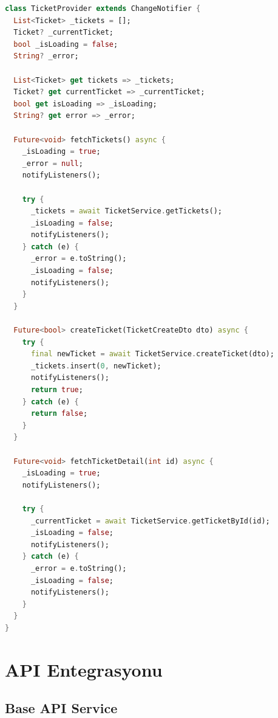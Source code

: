 \documentclass[12pt,a4paper]{article}
\begin{document}
\begin{lstlisting}[language=Dart]
class TicketProvider extends ChangeNotifier {
  List<Ticket> _tickets = [];
  Ticket? _currentTicket;
  bool _isLoading = false;
  String? _error;
  
  List<Ticket> get tickets => _tickets;
  Ticket? get currentTicket => _currentTicket;
  bool get isLoading => _isLoading;
  String? get error => _error;
  
  Future<void> fetchTickets() async {
    _isLoading = true;
    _error = null;
    notifyListeners();
    
    try {
      _tickets = await TicketService.getTickets();
      _isLoading = false;
      notifyListeners();
    } catch (e) {
      _error = e.toString();
      _isLoading = false;
      notifyListeners();
    }
  }
  
  Future<bool> createTicket(TicketCreateDto dto) async {
    try {
      final newTicket = await TicketService.createTicket(dto);
      _tickets.insert(0, newTicket);
      notifyListeners();
      return true;
    } catch (e) {
      return false;
    }
  }
  
  Future<void> fetchTicketDetail(int id) async {
    _isLoading = true;
    notifyListeners();
    
    try {
      _currentTicket = await TicketService.getTicketById(id);
      _isLoading = false;
      notifyListeners();
    } catch (e) {
      _error = e.toString();
      _isLoading = false;
      notifyListeners();
    }
  }
}
\end{lstlisting}

\newpage

\section{API Entegrasyonu}

\subsection{Base API Service}
\end{document}
